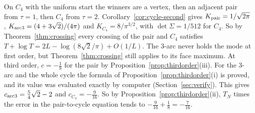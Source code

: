 \begin{remark}\label{rem:C4}
On $C_4$ with the uniform start the winners are a vertex, then an adjacent pair
from $\tau=1$, then $C_4$ from $\tau=2$. Corollary~\ref{cor:cycle-second} gives
$K_{\rm pair}=1/\sqrt{2\pi}$, $K_{\rm arc3}=(4+3\sqrt2)/(4\pi)$ and
$K_{C_4}=8/\pi^{3/2}$, with $\det\Sigma=1/512$ for $C_4$. So by
Theorem~\ref{thm:crossing} every crossing of the pair and $C_4$ satisfies
$T+\log T=2L-\log(8\sqrt2/\pi)+O(1/L)$. The 3-arc never holds the mode at first
order, but Theorem~\ref{thm:crossing} still applies to its face maximum. At
third order, $c=-\frac18$ for the pair by Proposition~\ref{prop:thirdorder}(iii).
For the 3-arc and the whole cycle the formula of
Proposition~\ref{prop:thirdorder}(i) is proved, and its value was evaluated
exactly by computer (Section~\ref{sec:verify}). This gives $c_{\rm
arc3}=\frac54\sqrt2-2$ and $c_{C_4}=-\frac9{16}$. So by
Proposition~\ref{prop:thirdorder}(ii), $T_N$ times the error in the pair-to-cycle
equation tends to $-\frac9{16}+\frac18=-\frac7{16}$.
\end{remark}

